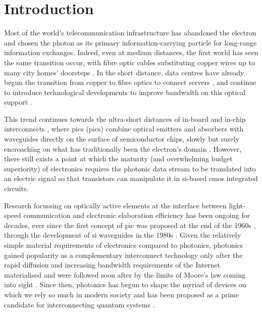 \chapter{Introduction}
\label{chap:introduction}

Most of the world's telecommunication infrastructure has abandoned the electron and chosen the photon as its primary information-carrying particle for long-range information exchanges. Indeed, even at medium distances, the first world has seen the same transition occur, with fibre optic cables substituting copper wires up to many city homes' doorsteps \cite{ECBroadband, ETNOBroadband}. In the short distance, data centres have already begun the transition from copper to fibre optics to connect servers \cite{Chakravarty2017, Urata2016}, and continue to introduce technological developments to improve bandwidth on this optical support \cite{Cheng2018}. 

This trend continues towards the ultra-short distances of in-board and in-chip interconnects \cite{Benner2005}, where \acl{pic}s (\acs{pic}s) combine optical emitters and absorbers with waveguides directly on the surface of semiconductor chips, slowly but surely encroaching on what has traditionally been the electron's domain \cite{Shekhar2024, Margalit2021, Smit2019}. However, there still exists a point at which the maturity (and overwhelming budget superiority) of electronics requires the photonic data stream to be translated into an electric signal so that transistors can manipulate it in \acl{si}-based \acf{cmos} integrated circuits. 

Research focussing on optically active elements at the interface between light-speed communication and electronic elaboration efficiency has been ongoing for decades, ever since the first concept of \acs{pic} was proposed at the end of the 1960s \cite{Miller1969}, through the development of \acl{si} waveguides in the 1980s \cite{Soref1987, Pathak2019}. Given the relatively simple material requirements of electronics compared to photonics, photonics gained popularity as a complementary interconnect technology only after the rapid diffusion and increasing bandwidth requirements of the Internet materialised and were followed soon after by the limits of Moore's law coming into sight \cite{Margalit2021, Bohr1995, Markov2014}. Since then, photonics has begun to shape the myriad of devices on which we rely so much in modern society and has been proposed as a prime candidate for interconnecting quantum systems \cite{Luo2023}.

